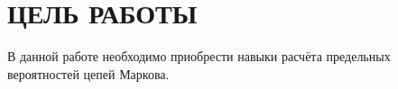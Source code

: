 \section{ЦЕЛЬ РАБОТЫ}

В данной работе необходимо приобрести навыки расчёта предельных вероятностей
цепей Маркова.
